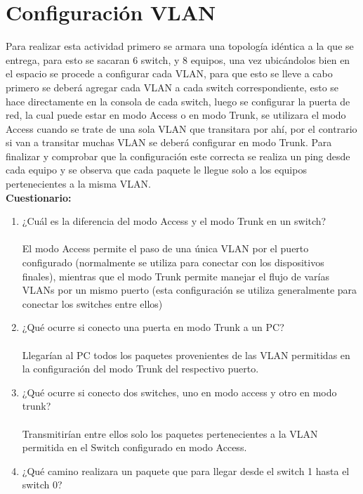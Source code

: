\documentclass{udpreport}
\begin{document}
	\section{Configuración VLAN}
	Para realizar esta actividad primero se armara una topología idéntica a la que se entrega, para esto se sacaran 6 switch, y 8
	equipos, una vez ubicándolos bien en el espacio se procede a configurar cada VLAN, para que esto se lleve a cabo primero se
	deberá agregar cada VLAN a cada switch correspondiente, esto se hace directamente en la consola de cada switch, luego se
	configurar la puerta de red, la cual puede estar en modo Access o en modo Trunk, se utilizara el modo Access cuando se trate
	de una sola VLAN que transitara por ahí, por el contrario si van a transitar muchas VLAN se deberá configurar en modo Trunk.
	Para finalizar y comprobar que la configuración este correcta se realiza un ping desde cada equipo y se observa que cada
	paquete le llegue solo a los equipos pertenecientes a la misma VLAN.\\
	{\large \bf{Cuestionario: }}\\
	\begin{enumerate}
	    \item ¿Cuál es la diferencia del modo Access y el modo Trunk en un switch?\\\\
	         El modo Access permite el paso de una única VLAN por el puerto configurado (normalmente se utiliza para conectar con
	         los dispositivos finales), mientras que el modo Trunk permite manejar el flujo de varías VLANs por un mismo puerto 
	         (esta configuración se utiliza generalmente para conectar los switches entre ellos)
        \item  ¿Qué ocurre si conecto una puerta en modo Trunk a un PC?\\\\
            Llegarían al PC todos los paquetes provenientes de las VLAN permitidas en la configuración del modo Trunk del respectivo
            puerto.
        \item ¿Qué ocurre si conecto dos switches, uno en modo access y otro en modo trunk?\\\\
              Transmitirían entre ellos solo los paquetes pertenecientes a la VLAN 
  	      permitida en el Switch configurado en modo Access.
  	     \item  ¿Qué camino realizara un paquete que para llegar desde el switch 1 hasta el switch 0?\\\\
  	     
	\end{enumerate}
\end{document}
